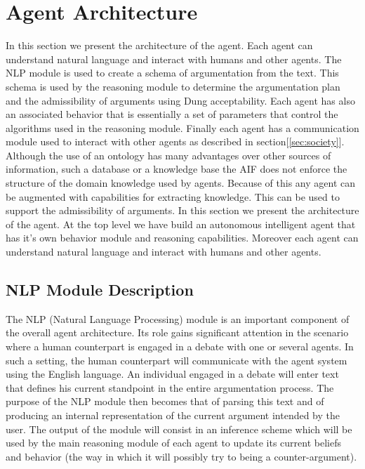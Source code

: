 \section{Agent Architecture}
\label{sec:application}

In this section we present the architecture of the agent. Each agent can understand natural language and interact with humans and other agents. The NLP module is used to create a schema of argumentation from the text. This schema is used by the reasoning module to determine the argumentation plan and the admissibility of arguments using Dung acceptability. Each agent has also an associated behavior that is essentially a set of parameters that control the algorithms used in the reasoning module. Finally each agent has a communication module used to interact with other agents as described in section[\ref{sec:society}].
Although the use of an ontology has many advantages over other sources of information, such a database or a knowledge base the AIF does not enforce the structure of the domain knowledge used by agents. Because of this any agent can be augmented with capabilities for extracting knowledge. This can be used to support the admissibility of arguments.
In this section we present the architecture of the agent. At the top level we have build an autonomous intelligent agent that has it's own behavior module and reasoning capabilities. Moreover each agent can understand natural language and interact with humans and other agents.


\subsection{NLP Module Description}

The NLP (Natural Language Processing) module is an important component of the overall agent architecture. Its role gains significant attention in the scenario where a human counterpart is engaged in a debate with one or several agents.
In such a setting, the human counterpart will communicate with the agent system using the English language. An individual engaged in a debate will enter text that defines his current standpoint in the entire argumentation process.
The purpose of the NLP module then becomes that of parsing this text and of producing an internal representation of the current argument intended by the user. The output of the module will consist in an inference scheme which will be used by
the main reasoning module of each agent to update its current beliefs and behavior (the way in which it will possibly try to being a counter-argument).

